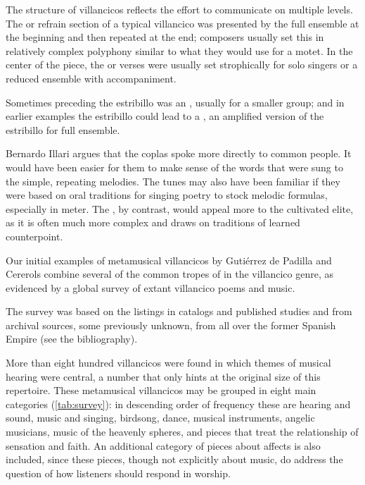 The structure of villancicos reflects the effort to communicate on multiple
levels.
The  or refrain section of a typical villancico was presented
by the full ensemble at the beginning and then repeated at the end; composers
usually set this in relatively complex polyphony similar to what they would use
for a motet.%
In the center of the piece, the  or verses were usually set
strophically for solo singers or a reduced ensemble with accompaniment.%
\begin{Footnote}
    Sometimes preceding the estribillo was an , usually for
    a smaller group; and in earlier examples the estribillo could lead to a
    , an amplified version of the estribillo for full
    ensemble.
\end{Footnote}
Bernardo Illari argues that the coplas spoke more directly to common people.%
    \Autocite{Illari:Popular}
It would have been easier for them to make sense of the words that were sung to
the simple, repeating melodies.
The tunes may also have been familiar if they were based on oral traditions for
singing poetry to stock melodic formulas, especially in  meter.%
The , by contrast, would appeal more to the cultivated elite,
as it is often much more complex and draws on traditions of learned
counterpoint.

Our initial examples of metamusical villancicos by Gutiérrez de Padilla and
Cererols combine several of the common tropes of  in
the villancico genre, as evidenced by a global survey of extant villancico
poems and music.%
\begin{Footnote}
    The survey was based on the listings in catalogs and published studies and
    from archival sources, some previously unknown, from all over the former
    Spanish Empire (see the bibliography).
\end{Footnote}
More than eight hundred villancicos were found in which themes of musical
hearing were central, a number that only hints at the original size of this
repertoire.
These metamusical villancicos may be grouped in eight main categories
(\cref{tab:survey}): in descending order of frequency these are hearing and
sound, music and singing, birdsong, dance, musical instruments, angelic
musicians, music of the heavenly spheres, and pieces that treat the
relationship of sensation and faith.
An additional category of pieces about affects is also included, since these
pieces, though not explicitly about music, do address the question of how
listeners should respond in worship. 

